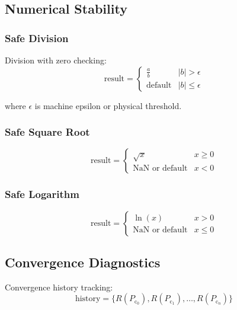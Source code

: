 \documentclass[12pt,a4paper]{article}
\newcommand{\Pc}{P_{\text{c}}}
\begin{document}
\subsection{Numerical Stability}

\subsubsection{Safe Division}

Division with zero checking:
\begin{equation}
\text{result} = \begin{cases}
\frac{a}{b} & |b| > \epsilon \\
\text{default} & |b| \leq \epsilon
\end{cases}
\end{equation}

where $\epsilon$ is machine epsilon or physical threshold.

\subsubsection{Safe Square Root}

\begin{equation}
\text{result} = \begin{cases}
\sqrt{x} & x \geq 0 \\
\text{NaN or default} & x < 0
\end{cases}
\end{equation}

\subsubsection{Safe Logarithm}

\begin{equation}
\text{result} = \begin{cases}
\ln(x) & x > 0 \\
\text{NaN or default} & x \leq 0
\end{cases}
\end{equation}

\subsection{Convergence Diagnostics}

Convergence history tracking:
\begin{equation}
\text{history} = \{R(\Pc_0), R(\Pc_1), \ldots, R(\Pc_n)\}
\end{equation}
\end{document}
